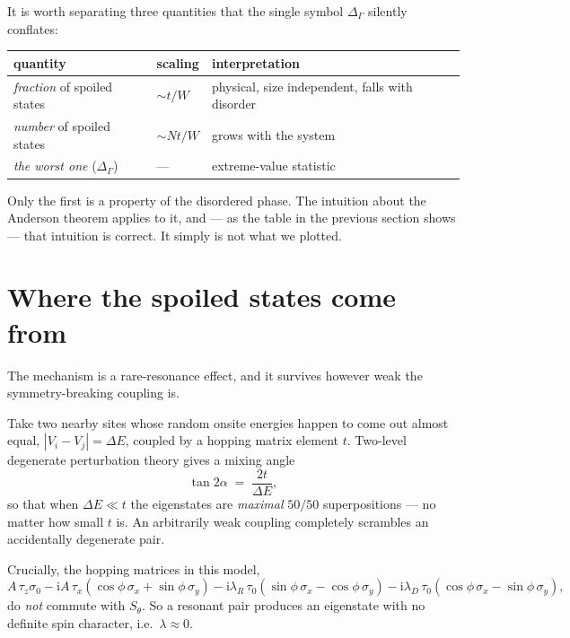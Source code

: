 \documentclass[11pt,a4paper]{article}
\newcommand{\Sth}{S_\theta}
\begin{document}
\noindent
It is worth separating three quantities that the single symbol
$\Delta_\Gamma$ silently conflates:
\begin{center}
\begin{tabular}{@{}lll@{}}
\toprule
quantity & scaling & interpretation \\
\midrule
\emph{fraction} of spoiled states & $\sim t/W$ & physical, size independent, falls with disorder \\
\emph{number} of spoiled states   & $\sim N t/W$ & grows with the system \\
\emph{the worst one} ($\Delta_\Gamma$) & --- & extreme-value statistic \\
\bottomrule
\end{tabular}
\end{center}
Only the first is a property of the disordered phase. The intuition about the
Anderson theorem applies to it, and --- as the table in the previous section
shows --- that intuition is correct. It simply is not what we plotted.

\section{Where the spoiled states come from}

The mechanism is a rare-resonance effect, and it survives however weak the
symmetry-breaking coupling is.

Take two nearby sites whose random onsite energies happen to come out almost
equal, $|V_i-V_j| = \Delta E$, coupled by a hopping matrix element $t$.
Two-level degenerate perturbation theory gives a mixing angle
\begin{equation}
  \tan 2\alpha \;=\; \frac{2t}{\Delta E} ,
\end{equation}
so that when $\Delta E \ll t$ the eigenstates are \emph{maximal} $50/50$
superpositions --- no matter how small $t$ is. An arbitrarily weak coupling
completely scrambles an accidentally degenerate pair.

Crucially, the hopping matrices in this model,
\begin{equation}
  A\,\tau_z\sigma_0
  - \mathrm{i}A\,\tau_x(\cos\phi\,\sigma_x + \sin\phi\,\sigma_y)
  - \mathrm{i}\lambda_R\,\tau_0(\sin\phi\,\sigma_x - \cos\phi\,\sigma_y)
  - \mathrm{i}\lambda_D\,\tau_0(\cos\phi\,\sigma_x - \sin\phi\,\sigma_y),
\end{equation}
do \emph{not} commute with $\Sth$. So a resonant pair produces an eigenstate
with no definite spin character, i.e.\ $\lambda \approx 0$.
\end{document}

